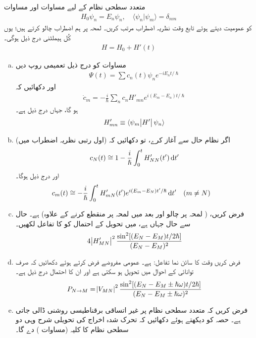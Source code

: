 متعدد سطحی نظام کے لیے مساوات  اور مساوات 
\begin{align}
	H_0\psi_n = E_n\psi_n,\quad \langle \psi_n|\psi_m \rangle = \delta_{nm}
\end{align}
کو عمومیت دیتے ہوئے تابع وقت نظریہ اضطراب مرتب کریں۔ لمحہ  پر ہم اضطراب  چالو کرتے ہیں؛ یوں کُل ہیملٹنی درج ذیل ہوگی۔
\begin{align}
	H = H_0 + H'(t)
\end{align}
\begin{enumerate}[a.]
\item
 مساوات  کو درج ذیل تعمیمی روپ دیں
\begin{align}
	\Psi(t) = \sum c_n(t)\psi_ne^{-iE_nt/\hslash}
\end{align}
اور دکھائیں کہ
\begin{align}\label{مساوات_تابع_مضطرب_تفرق_شرح_مستقل}
	\dot{c}_m = -\frac{i}{\hslash}\sum_{n} c_nH'_{mn}e^{i(E_m-E_n)t/\hslash}
\end{align}
ہو گا، جہاں  درج ذیل ہے۔
\begin{align}
	H'_{mn} \equiv \langle \psi_m\abs{H'}\psi_n \rangle
\end{align}
\item
اگر نظام حال  سے آغاز کرے، تو دکھائیں کہ (اول رتبی نظریہ اضطراب میں) 
\begin{align}
	c_N(t)\cong1-\frac{i}{\hslash}\int_{0}^{t}H'_{NN}(t')\dif t'
\end{align}
اور درج ذیل ہوگا۔
\begin{align}
	c_m(t)&\cong-\frac{i}{\hslash}\int_{0}^{t}H'_{mN}(t')e^{i(E_m-E_N)t'/\hslash}\dif t'&& (m\neq N)
\end{align}
\item
 فرض کریں، ( لمحہ  پر چالو اور بعد میں لمحہ  پر منقطع کرنے کے علاوہ)   ہے۔ حال  سے حال  جہاں  ہے، میں تحویل کے احتمال کو  کا تفاعل لکھیں۔
\begin{align}
	4\abs{H'_{MN}}^2\frac{\sin^2[(E_N-E_M)t/2\hslash]}{(E_N-E_M)^2}
\end{align}
\item
 فرض کریں  وقت کا سائن نما تفاعل:  ہے۔ عمومی مفروضے فرض کرتے ہوئے دکھائیں کہ صرف توانائی  کے احوال میں تحویل ہو سکتی ہے اور ان کا احتمال درج ذیل ہے۔
\begin{align}
	P_{N\to M} = \abs{V_{MN}}^2\frac{\sin^2[(E_N-E_M\pm\hslash\omega)t/2\hslash]}{(E_N-E_M\pm\hslash\omega)^2}
\end{align}
\item
 فرض کریں کہ متعدد سطحی نظام پر غیر اتساقی برقناطیسی روشنی ڈالی جاتی ہے۔ حصہ  کو دیکھتے ہوئے دکھائیں کہ تحرک شدہ اخراج کی تحویلی شرح وہی دو سطحی نظام کا کلیہ (مساوات ) دے گا۔
 \end{enumerate}
